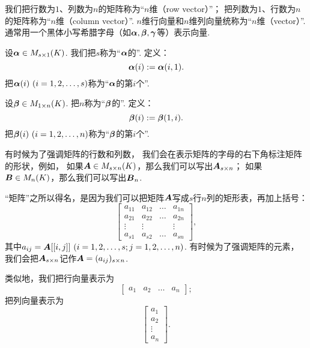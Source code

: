 我们把行数为\(1\)、列数为\(n\)的矩阵称为“\(n\)维（row vector）”；
把列数为\(1\)、行数为\(n\)的矩阵称为“\(n\)维（column vector）”.
\(n\)维行向量和\(n\)维列向量统称为“\(n\)维（vector）”.
通常用一个黑体小写希腊字母（如\(\boldsymbol\alpha,\boldsymbol\beta,\boldsymbol\gamma\)等）表示向量.

设\(\boldsymbol\alpha\in M_{s \times 1}(K)\).
我们把\(s\)称为“\(\boldsymbol\alpha\)的”.
定义：\begin{equation*}
	\boldsymbol\alpha(i) := \boldsymbol\alpha(i,1).
\end{equation*}
把\(\vb\alpha(i)\ (i=1,2,\dotsc,s)\)称为“\(\boldsymbol\alpha\)的第\(i\)个”.

设\(\boldsymbol\beta\in M_{1 \times n}(K)\).
把\(n\)称为“\(\boldsymbol\beta\)的”.
定义：\begin{equation*}
	\boldsymbol\beta(i) := \boldsymbol\beta(1,i).
\end{equation*}
把\(\vb\beta(i)\ (i=1,2,\dotsc,n)\)称为“\(\boldsymbol\beta\)的第\(i\)个”.

有时候为了强调矩阵的行数和列数，
我们会在表示矩阵的字母的右下角标注矩阵的形状，例如，
如果\(\boldsymbol{A} \in M_{s \times n}(K)\)，那么我们可以写出\(\boldsymbol{A}_{s \times n}\)；
如果\(\boldsymbol{B}\in M_n(K)\)，那么我们可以写出\(\boldsymbol{B}_n\).

“矩阵”之所以得名，是因为我们可以把矩阵\(\boldsymbol{A}\)写成\(s\)行\(n\)列的矩形表，再加上括号：\begin{equation*}
	\begin{bmatrix}
		a_{11} & a_{12} & \dots & a_{1n} \\
		a_{21} & a_{22} & \dots & a_{2n} \\
		\vdots & \vdots & & \vdots \\
		a_{s1} & a_{s2} & \dots & a_{sn}
	\end{bmatrix},
\end{equation*}
其中\(
	a_{ij}
	= \boldsymbol{A}[[i,j]]
	\ (i=1,2,\dotsc,s;j=1,2,\dotsc,n)
\).
有时候为了强调矩阵的元素，
我们会把\(\boldsymbol{A}_{s \times n}\)记作\(\boldsymbol{A}=(a_{ij})_{s \times n}\).

类似地，我们把行向量表示为\begin{equation*}
	\begin{bmatrix}
		a_1 & a_2 & \dots & a_n
	\end{bmatrix};
\end{equation*}
把列向量表示为\begin{equation*}
	\begin{bmatrix}
		a_1 \\ a_2 \\ \vdots \\ a_n
	\end{bmatrix}.
\end{equation*}

